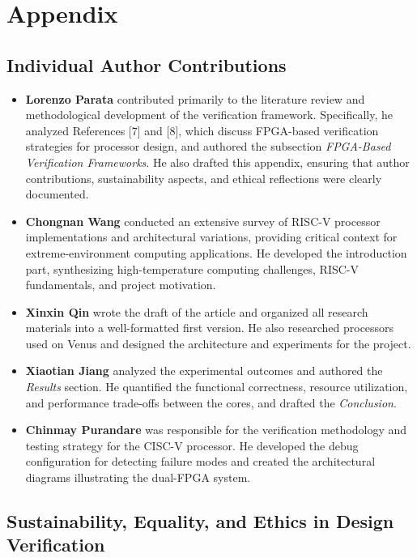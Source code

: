 \documentclass[10pt,twocolumn]{article}
\begin{document}
\clearpage
\appendix
\section*{Appendix}

\subsection*{Individual Author Contributions}
\begin{itemize}
    \item \textbf{Lorenzo Parata} contributed primarily to the literature review and methodological development of the verification framework. Specifically, he analyzed References [7] and [8], which discuss FPGA-based verification strategies for processor design, and authored the subsection \textit{FPGA-Based Verification Frameworks}.  
    He also drafted this appendix, ensuring that author contributions, sustainability aspects, and ethical reflections were clearly documented.
    \item \textbf{Chongnan Wang} conducted an extensive survey of RISC-V processor implementations and architectural variations, providing critical context for extreme-environment computing applications.  
    He developed the introduction part, synthesizing high-temperature computing challenges, RISC-V fundamentals, and project motivation.
    \item \textbf{Xinxin Qin} wrote the draft of the article and organized all research materials into a well-formatted first version.  
    He also researched processors used on Venus and designed the architecture and experiments for the project.
    \item \textbf{Xiaotian Jiang} analyzed the experimental outcomes and authored the \textit{Results} section.  
    He quantified the functional correctness, resource utilization, and performance trade-offs between the cores, and drafted the \textit{Conclusion}.
    \item \textbf{Chinmay Purandare} was responsible for the verification methodology and testing strategy for the CISC-V processor.  
    He developed the debug configuration for detecting failure modes and created the architectural diagrams illustrating the dual-FPGA system.
\end{itemize}

\subsection*{Sustainability, Equality, and Ethics in Design Verification}
\end{document}
